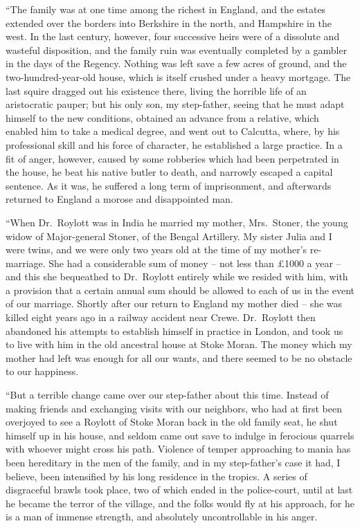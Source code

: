 “The family was at one time among the richest in England,
and the estates extended over the borders into Berkshire in
the north, and Hampshire in the west. In the last century,
however, four successive heirs were of a dissolute and wasteful
disposition, and the family ruin was eventually completed
by a gambler in the days of the Regency. Nothing was left
save a few acres of ground, and the two-hundred-year-old
house, which is itself crushed under a heavy mortgage. The
last squire dragged out his existence there, living the horrible
life of an aristocratic pauper; but his only son, my step-father,
seeing that he must adapt himself to the new conditions, obtained
an advance from a relative, which enabled him to take
a medical degree, and went out to Calcutta, where, by his
professional skill and his force of character, he established a
large practice. In a fit of anger, however, caused by some
robberies which had been perpetrated in the house, he beat
his native butler to death, and narrowly escaped a capital
sentence. As it was, he suffered a long term of imprisonment,
and afterwards returned to England a morose and disappointed
man.

“When Dr.\ Roylott was in India he married my mother,
Mrs.~Stoner, the young widow of Major-general Stoner, of the
Bengal Artillery. My sister Julia and I were twins, and we
were only two years old at the time of my mother’s re-marriage.
She had a considerable sum of money -- not less than
£1000 a year -- and this she bequeathed to Dr.\ Roylott
entirely while we resided with him, with a provision that a
certain annual sum should be allowed to each of us in the
event of our marriage. Shortly after our return to England
my mother died -- she was killed eight years ago in a railway
accident near Crewe. Dr.\ Roylott then abandoned his attempts
to establish himself in practice in London, and took
us to live with him in the old ancestral house at Stoke Moran.
The money which my mother had left was enough for all our
wants, and there seemed to be no obstacle to our happiness.

“But a terrible change came over our step-father about this
time. Instead of making friends and exchanging visits with our
neighbors, who had at first been overjoyed to see a Roylott of
Stoke Moran back in the old family seat, he shut himself up
in his house, and seldom came out save to indulge in ferocious
quarrels with whoever might cross his path. Violence of
temper approaching to mania has been hereditary in the men of
the family, and in my step-father’s case it had, I believe, been
intensified by his long residence in the tropics. A series of
disgraceful brawls took place, two of which ended in the
police-court, until at last he became the terror of the village,
and the folks would fly at his approach, for he is a man of immense
strength, and absolutely uncontrollable in his anger.

